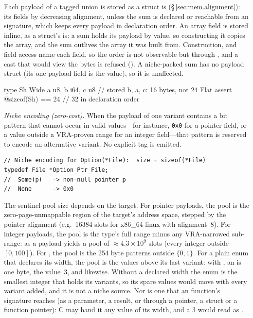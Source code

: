 \pnum
Each payload of a tagged union is stored as a struct is (\S\,\ref{sec:mem.alignment}): its
fields by decreasing alignment, unless the sum is declared \tok{[ordered]} or reachable from an
 signature, which keeps every payload in declaration order. An array field is
stored inline, as a struct's is: a sum holds its payload by value, so constructing it copies
the array, and the sum outlives the array it was built from. Construction,
 and field access name each field, so the order is not observable but through
, and a cast that would view the bytes is refused (). A
niche-packed sum has no payload struct (its one payload field is the value), so it is
unaffected.

\begin{laincode}
type Sh {
    Wide { a u8, b i64, c u8 }   // stored {b, a, c}: 16 bytes, not 24
    Flat
}
assert @sizeof(Sh) == 24         // 32 in declaration order
\end{laincode}

\pnum
\textit{Niche encoding (zero-cost).}  When the payload of one variant
contains a bit pattern that cannot occur in valid values---for instance,
\texttt{0x0} for a pointer field, or a value outside a VRA-proven
range for an integer field---that pattern is reserved to encode an
alternative variant.  No explicit tag is emitted.

\begin{verbatim}
// Niche encoding for Option(*File):  size = sizeof(*File)
typedef File *Option_Ptr_File;
//  Some(p)   -> non-null pointer p
//  None      -> 0x0
\end{verbatim}

\pnum
The sentinel pool size depends on the target. For pointer payloads,
the pool is the zero-page-unmappable region of the target's address
space, stepped by the pointer alignment (e.g.\ 16384 slots for
x86\_64-linux with alignment~8). For integer payloads, the pool is
the type's full range minus any VRA-narrowed sub-range:
 as a payload yields a pool
of $\approx 4.3 \times 10^9$ slots (every integer outside $[0,100]$).
For , the pool is the 254 byte patterns outside $\{0, 1\}$.
For a plain enum that declares its width, the pool is the values above its last variant: with
, an  is one byte, 
the value~3, and  likewise. Without a declared width the enum is the smallest
integer that holds its variants, so its spare values would move with every variant added, and
it is not a niche source. Nor is one that an  function's signature reaches (as a
parameter, a result, or through a pointer, a struct or a function pointer): C may hand it any
value of its width, and a 3 would read as .

